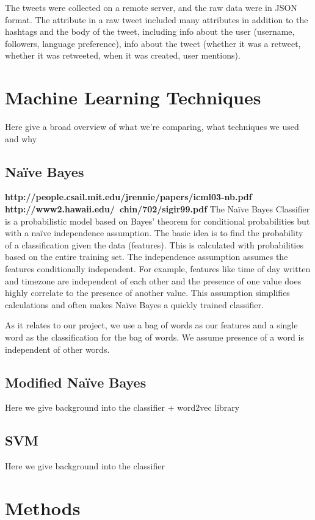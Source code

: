 \documentclass[11pt,letterpaper]{article}
\begin{document}
The tweets were collected on a remote server, and the raw data were in JSON format. The attribute in a raw tweet included many attributes in addition to the hashtags and the body of the tweet, including info about the user (username, followers, language preference), info about the tweet (whether it was a retweet, whether it was retweeted, when it was created, user mentions).

\section{Machine Learning Techniques}
Here give a broad overview of what we're comparing, what techniques we used and why

\subsection{Na{\"i}ve Bayes}
\textbf{http://people.csail.mit.edu/jrennie/papers/icml03-nb.pdf} \textbf{http://www2.hawaii.edu/~chin/702/sigir99.pdf}
  The Na{\"i}ve Bayes Classifier is a probabilistic model based on Bayes' theorem for conditional probabilities but with a na{\"i}ve independence assumption. The basic idea is to find the probability of a classification given the data  (features). This is calculated with probabilities based on the entire training set. The independence assumption assumes the features conditionally independent. For example, features like time of day written and timezone are independent of each other and the presence of one value does highly correlate to the presence of another value. This assumption simplifies calculations and often makes Na{\"i}ve Bayes a quickly trained classifier.

As it relates to our project, we use a bag of words as our features and a single word as the classification for the bag of words. We assume presence of a word is independent of other words. 


\subsection{Modified Na{\"i}ve Bayes}
Here we give background into the classifier + word2vec library

\subsection{SVM}
Here we give background into the classifier

\section{Methods}
\end{document}
